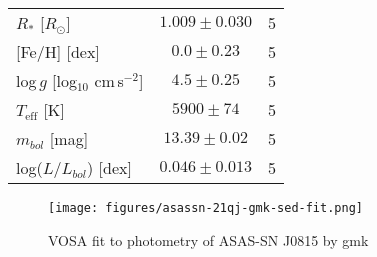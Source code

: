 \documentclass{aa}
\newcommand{\teff}{$T_\mathrm{eff}$}
\newcommand{\rsun}{$R_\odot$}
\begin{document}
\begin{table}
\begin{tabular}{@{}lcc@{}}
        \hline
         $R_*$ [\rsun{}]                        & $1.009\pm0.030$           & 5     \\
         {[}Fe/H{]} [dex]                       & $0.0\pm0.23$               & 5     \\
         log\,$g$ [log$_{10}$ cm\,s$^{-2}$]     & $4.5\pm0.25$               & 5     \\
         \teff{} [K]                            & $5900\pm74$               & 5     \\
         $m_{bol}$ [mag]                        & $13.39\pm0.02$           & 5     \\
         log($L/L_{bol}$) [dex]                 & $0.046\pm0.013$        & 5     \\
         
        \hline
    \end{tabular}
    \label{tab:Stellarprop}
\end{table}






\begin{figure}
   \centering
   \texttt{[image: figures/asassn-21qj-gmk-sed-fit.png]}
      \caption{VOSA fit to photometry of ASAS-SN J0815 by gmk}
         \label{fig:sed}
\end{figure}
\end{document}
